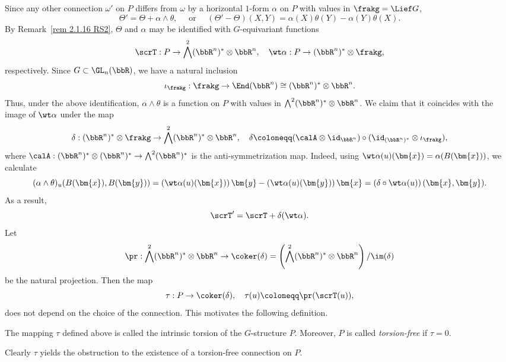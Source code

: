 Since any other connection $\omega'$ on $P$ differs from $\omega$ by a horizontal $1$-form $\alpha$ on $P$ with values in $\frakg=\Lief G$,
\[\Theta'=\Theta+\alpha\wedge\theta,\quad\text{ or }\quad (\Theta'-\Theta)(X,Y)=\alpha(X)\theta(Y)-\alpha(Y)\theta(X).\]
By Remark~\ref{rem 2.1.16 RS2}, $\Theta$ and $\alpha$ may be identified with $G$-equivariant functions 
\[\scrT:P\to \bigwedge^2(\bbR^n)^\ast\otimes\bbR^n,\quad \wt\alpha:P\to (\bbR^n)^\ast\otimes\frakg,\]
respectively. Since $G\subset\GL_n(\bbR)$, we have a natural inclusion 
\[\iota_\frakg:\frakg\to \End(\bbR^n)\cong (\bbR^n)^\ast\otimes\bbR^n.\]
Thus, under the above identification, $\alpha\wedge\theta$ is a function on $P$ with values in $\bigwedge^2(\bbR^n)^\ast\otimes\bbR^n$. We claim that it coincides with the image of $\wt\alpha$ under the map 
\[\delta:(\bbR^n)^\ast\otimes\frakg\to \bigwedge^2(\bbR^n)^\ast\otimes\bbR^n,\quad \delta\coloneqq (\calA\otimes\id_{\bbR^n})\circ(\id_{(\bbR^n)^\ast}\otimes \iota_\frakg),\]
where $\calA:(\bbR^n)^\ast\otimes (\bbR^n)^\ast\to \bigwedge^2(\bbR^n)^\ast$ is the anti-symmetrization map. Indeed, using $\wt\alpha(u)(\bm{x})=\alpha(B(\bm{x}))$, we calculate 
\[(\alpha\wedge\theta)_u(B(\bm{x}),B(\bm{y}))=\left(\wt\alpha(u)(\bm{x})\right)\bm{y}-\left(\wt\alpha(u)(\bm{y})\right)\bm{x}=\left(\delta\circ\wt\alpha(u)\right)(\bm{x},\bm{y}).\]
As a result,
\[\scrT'=\scrT+\delta(\wt\alpha).\label{eq 2.2.3 RS2}\]
Let 
\[\pr :\bigwedge^2(\bbR^n)^\ast\otimes\bbR^n\to \coker(\delta)=\left(\bigwedge^2(\bbR^n)^\ast\otimes\bbR^n\right)\slash\im(\delta)\]
be the natural projection. Then the map 
\[\tau:P\to \coker(\delta),\quad \tau(u)\coloneqq \pr(\scrT(u)),\]
does not depend on the choice of the connection. This motivates the following definition.

\begin{defn}
    The mapping $\tau$ defined above is called the intrinsic torsion of the $G$-structure $P$. Moreover, $P$ is called \emph{torsion-free} if $\tau=0$.
\end{defn}

Clearly $\tau$ yields the obstruction to the existence of a torsion-free connection on $P$.

